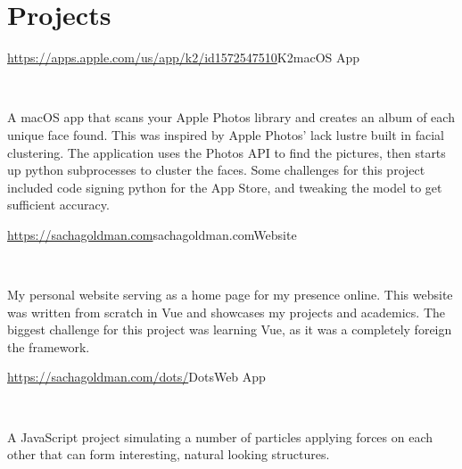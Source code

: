 \documentclass[]{style}
\begin{document}
\begin{entrylist}
\end{entrylist}



\section{Projects}

\begin{entrylist}


\vspace{2mm}

\entry
{\url{https://apps.apple.com/us/app/k2/id1572547510}{K2}}{macOS App}
{ ~ \vspace{-2.5mm}

   

A macOS app that scans your Apple Photos library and creates an album of each unique face found. This was inspired by Apple Photos' lack lustre built in facial clustering. The application uses the Photos API to find the pictures, then starts up python subprocesses  to cluster the faces. Some challenges for this project included code signing python for the App Store, and tweaking the model to get sufficient accuracy.}


\vspace{2mm}

\entry
{\url{https://sachagoldman.com}{sachagoldman.com}}{Website}
{ ~ \vspace{-2.5mm}

 

My personal website serving as a home page for my presence online. This website was written from scratch in Vue and showcases my projects and academics. The biggest challenge for this project was learning Vue, as it was a completely foreign the framework.}



\entry
{\url{https://sachagoldman.com/dots/}{Dots}}{Web App}
{ ~ \vspace{-2.5mm}


A JavaScript project simulating a number of particles applying forces on each other that can form interesting, natural looking structures.}


\end{entrylist}
\end{document}
